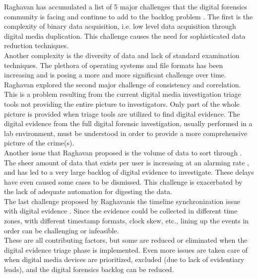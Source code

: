 \documentclass[12pt]{article}
\begin{document}
Raghavan has accumulated a list of 5 major challenges
that the digital forensics community is facing and continue to add to the backlog
problem \cite{raghavan2013digital}.  The first is the complexity of binary data
acquisition, i.e. low level
data acquisition through digital media duplication.  This challenge causes the need
for sophisticated data reduction techniques.\\

Another complexity is the diversity of data and lack of standard examination
techniques.  The plethora of operating systems and file formats has been
increasing and is posing a more and more significant challenge over time.\\

Raghavan explored the second major challenge of consistency and correlation.  This is a
problem resulting from the current digital media investigation triage tools not
providing the entire picture to investigators.  Only part of the whole picture
is provided when triage tools are utilized to find digital evidence.  The
digital evidence from the full digital forensic investigation, usually performed 
in a lab environment, must be understood in order to provide a more comprehensive
picture of the crime(s).\\

Another issue that Raghavan proposed is the volume of data to sort
through \cite{raghavan2013digital}.  The sheer amount of data that exists per user is increasing
at an alarming rate \cite{rogers2006computer}, and has led to a very large backlog of digital
evidence to investigate.  These delays have even caused some cases to be dismissed.
This challenge is exacerbated by the lack of adequate automation for digesting the
data.\\

The last challenge proposed by Raghavanis the timeline synchronization issue with
digital evidence \cite{raghavan2013digital}.  Since the evidence could be
collected in different time zones, with different timestamp formats, clock skew,
etc., lining up the events in order can be challenging or infeasible.\\

These are all contributing factors, but some are reduced or eliminated when 
the digital evidence triage phase is implemented.  Even more issues are taken care
of when digital media devices are prioritized, excluded (due to lack of
evidentiary leads), and the digital forensics backlog can be reduced.\\
\end{document}
